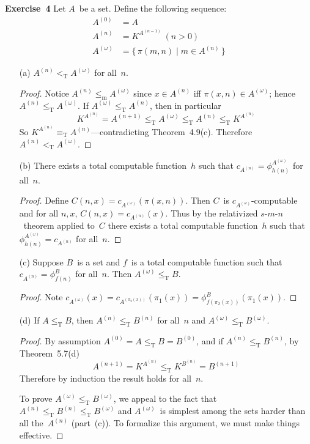 \documentclass[letterpaper]{article}
\newcommand{\exercise}[2][]{\noindent\textbf{Exercise~{#2}}\ifthenelse{\isempty{#1}}{\textbf{.}}{ ({#1})\textbf{.}}}
\newcommand{\mr}{\mathrel{\le_{\mathrm{m}}}}
\newcommand{\tr}{\mathrel{\le_{\mathrm{T}}}}
\newcommand{\tR}{\mathrel{<_{\mathrm{T}}}}
\newcommand{\te}{\mathrel{\equiv_{\mathrm{T}}}}
\newcommand{\smn}{$s$-$m$-$n$}
\theoremstyle{plain}
\theoremstyle{definition}
\theoremstyle{remark}
\begin{document}
\exercise{4}
Let $A$~be a set. Define the following sequence:
\begin{align*}
A^{(0)}&=A\\
A^{(n)}&=K^{A^{(n-1)}}\ (n>0)\\
A^{(\omega)}&=\{\,\pi(m,n)\mid m\in A^{(n)}\,\}
\end{align*}
\begin{enumerate}[itemsep=0pt]
\item[(a)] $A^{(n)}\tR A^{(\omega)}$ for all~$n$.
\begin{proof}
Notice $A^{(n)}\mr A^{(\omega)}$ since $x\in A^{(n)}$ iff $\pi(x,n)\in A^{(\omega)}$; hence $A^{(n)}\tr A^{(\omega)}$. If $A^{(\omega)}\tr A^{(n)}$, then in particular
$$K^{A^{(n)}}=A^{(n+1)}\tr A^{(\omega)}\tr A^{(n)}\tr K^{A^{(n)}}$$
So $K^{A^{(n)}}\te A^{(n)}$---contradicting Theorem~4.9(c). Therefore $A^{(n)}\tR A^{(\omega)}$.
\end{proof}
\item[(b)] There exists a total computable function~$h$ such that $c_{A^{(n)}}=\phi_{h(n)}^{A^{(\omega)}}$ for all~$n$.
\begin{proof}
Define $C(n,x)=c_{A^{(\omega)}}(\pi(x,n))$. Then $C$~is $c_{A^{(\omega)}}$-computable and for all $n,x$, $C(n,x)=c_{A^{(n)}}(x)$. Thus by the relativized \smn\ theorem applied to~$C$ there exists a total computable function~$h$ such that $\phi_{h(n)}^{A^{(\omega)}}=c_{A^{(n)}}$ for all~$n$.
\end{proof}
\item[(c)] Suppose $B$~is a set and $f$~is a total computable function such that $c_{A^{(n)}}=\phi_{f(n)}^B$ for all~$n$. Then $A^{(\omega)}\tr B$.
\begin{proof}
Note $c_{A^{(\omega)}}(x)=c_{A^{(\pi_2(x))}}(\pi_1(x))=\phi_{f(\pi_2(x))}^B(\pi_1(x))$.
\end{proof}
\item[(d)] If $A\tr B$, then $A^{(n)}\tr B^{(n)}$ for all~$n$ and $A^{(\omega)}\tr B^{(\omega)}$.
\begin{proof}
By assumption $A^{(0)}=A\tr B=B^{(0)}$, and if $A^{(n)}\tr B^{(n)}$, by Theorem~5.7(d)
$$A^{(n+1)}=K^{A^{(n)}}\tr K^{B^{(n)}}=B^{(n+1)}$$
Therefore by induction the result holds for all~$n$.

To prove $A^{(\omega)}\tr B^{(\omega)}$, we appeal to the fact that $A^{(n)}\tr B^{(n)}\tr B^{(\omega)}$ and $A^{(\omega)}$~is simplest among the sets harder than all the~$A^{(n)}$ (part~(c)). To formalize this argument, we must make things effective.


\end{proof}
\end{enumerate}
\end{document}
